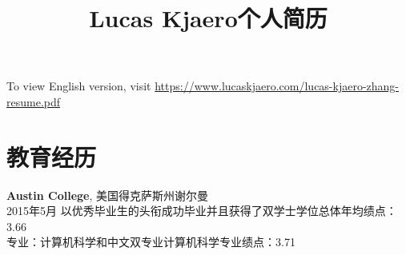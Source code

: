 \documentclass[margin]{res}
\title{Lucas Kjaero个人简历}
\begin{document}
\begin{CJK*}{UTF8}{gbsn}



\address{电话号码：+1 \(619\) 905-1772\\永久住址： San Diego, CA 92123}
\address{邮箱地址：\href{mailto:lucas@lucaskjaerozhang.com}{Lucas@LucasKjaeroZhang.com}\\个人网址：\href{https://www.lucaskjaerozhang.com}{www.LucasKjaeroZhang.com}}


\begin{resume}


\section{}
To view English version, visit \href{https://www.lucaskjaerozhang.com/lucas-kjaero-zhang-resume.pdf}{https://www.lucaskjaero.com/lucas-kjaero-zhang-resume.pdf}

\section{教育经历}
\textbf{Austin College}, 美国得克萨斯州谢尔曼\\
2015年5月 以优秀毕业生的头衔成功毕业并且获得了双学士学位\hfill 总体年均绩点：
3.66\\
专业：计算机科学和中文双专业\hfill 计算机科学专业绩点：3.71


\end{resume}
\end{CJK*}
\end{document}
